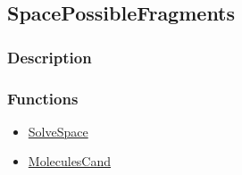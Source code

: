 \subsection{SpacePossibleFragments}\label{SpacePossibleFragments}
\subsubsection{Description}


\subsubsection{Functions}
\begin{itemize}
\item \hyperref[SolveSpace]{SolveSpace}
\item \hyperref[MoleculesCand]{MoleculesCand}
\end{itemize}

